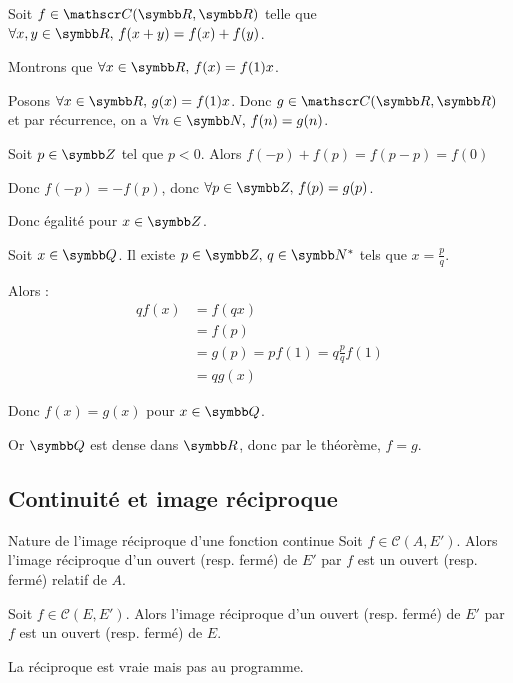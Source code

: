 \begin{exemple}
    Soit $f \in \mathscr C(\R, \R)$ telle que $\forall x, y \in \R, \, f(x + y) = f(x) + f(y)$.

    Montrons que $\forall x \in \R, \, f(x) = f(1) x$.

    Posons $\forall x \in \R, \, g(x) = f(1) x$. Donc $g \in \mathscr C(\R, \R)$ et 
    par récurrence, on a $\forall n \in \N, \, f(n) = g(n)$.

    Soit $p \in \Z$ tel que $p < 0$. Alors $f(-p) + f(p) = f(p - p) = f(0)$

    Donc $f(-p) = - f(p)$, donc $\forall p \in \Z, \, f(p) = g(p)$.

    Donc égalité pour $x \in \Z$. 

    Soit $x \in \Q$. Il existe $p \in \Z, \, q \in \N^*$ tels que $x = \frac p q$.

    Alors : 
    \begin{align*}
        qf(x) & = f(qx) \\
        & = f(p) \\
        & = g(p) = pf(1) = q \frac p q f(1) \\
        & = q g(x)
    \end{align*}

    Donc $f(x) = g(x)$ pour $x \in \Q$.

    Or $\Q$ est dense dans $\R$, donc par le théorème, $f = g$.
\end{exemple}

\subsection{Continuité et image réciproque }

\begin{theoreme}{Nature de l'image réciproque d'une fonction continue}{}
    Soit $f \in \mathscr C(A, E')$. Alors l'image réciproque d'un ouvert (resp. fermé) 
    de $E'$ par $f$ est un ouvert (resp. fermé) relatif de $A$.

    Soit $f \in \mathscr C(E, E')$. Alors l'image réciproque d'un ouvert (resp. fermé)
    de $E'$ par $f$ est un ouvert (resp. fermé) de $E$.
\end{theoreme}

\begin{remarque}
    La réciproque est vraie mais pas au programme.
\end{remarque}

